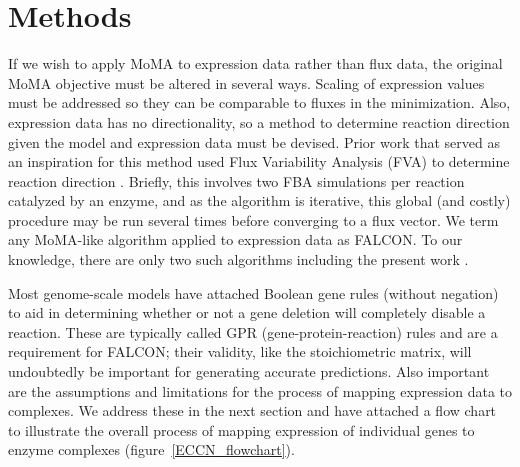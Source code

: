 \section{Methods}

If we wish to apply MoMA to expression data rather than flux data, the
original MoMA objective must be altered in several ways. Scaling of
expression values must be addressed so they can be comparable to
fluxes in the minimization. Also, expression data has no
directionality, so a method to determine reaction direction given the
model and expression data must be devised. Prior work that served as
an inspiration for this method used Flux Variability Analysis (FVA) to
determine reaction direction \citep{Lee2012}. Briefly, this involves
two FBA simulations per reaction catalyzed by an enzyme, and as the
algorithm is iterative, this global (and costly) procedure may be run
several times before converging to a flux vector. We term any
MoMA-like algorithm applied to expression data as FALCON. To our
knowledge, there are only two such algorithms including the present
work \citep{Lee2012}.

Most genome-scale models have attached Boolean gene rules (without
negation) to aid in determining whether or not a gene deletion will
completely disable a reaction. These are typically called GPR
(gene-protein-reaction) rules and are a requirement for FALCON; their
validity, like the stoichiometric matrix, will undoubtedly be
important for generating accurate predictions. Also important are the
assumptions and limitations for the process of mapping expression data
to complexes. We address these in the next section and have attached a
flow chart to illustrate the overall process of mapping expression of
individual genes to enzyme complexes (figure~\ref{ECCN_flowchart}).

